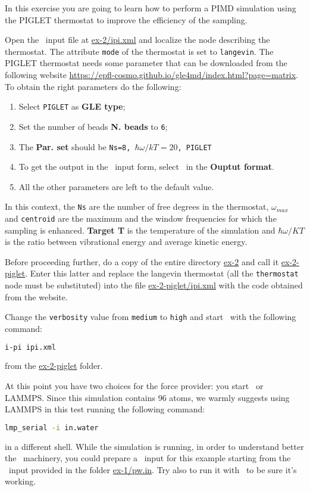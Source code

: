 \documentclass{article}
\begin{document}
\begin{Exercise}[label={inputs},title={Liquid water with the
    \emph{PIGLET} thermostat}]
In this exercise you are going to learn how to perform a PIMD
simulation using the PIGLET thermostat to improve the efficiency of
the sampling.

\Question
Open the \ipi\ input file at \url{ex-2/ipi.xml} and localize the node
describing the thermostat. The attribute \texttt{mode} of the
thermostat is set to \texttt{langevin}. The PIGLET thermostat needs
some parameter that can be downloaded from the following website
\url{https://epfl-cosmo.github.io/gle4md/index.html?page=matrix}.
To obtain the right parameters do the following:
\begin{enumerate}
\item Select \texttt{PIGLET} as \textbf{GLE type};
\item Set the number of beads \textbf{N. beads} to \texttt{6};
\item The \textbf{Par. set} should be \texttt{Ns=8,
    $\hbar\omega/kT=20$, PIGLET}
\item To get the output in the \ipi\ input form, select \ipi\ in the
  \textbf{Ouptut format}.
\item All the other parameters are left to the default value.
\end{enumerate}
In this context, the \texttt{Ns} are the number of free degrees in the
thermostat, $\omega_{max}$ and \texttt{centroid} are the maximum
and the window frequencies for which the sampling is
enhanced. \textbf{Target T} is the temperature of the simulation and
$\hbar\omega/KT$ is the ratio between vibrational energy and average
kinetic energy.

Before proceeding further, do a copy of the entire directory
\url{ex-2} and call it \url{ex-2-piglet}. Enter this latter and
replace the langevin thermostat (all the \texttt{thermostat} node must
be substituted) into the file \url{ex-2-piglet/ipi.xml} with the code
obtained from the website.

\Question
Change the \texttt{verbosity} value from \texttt{medium} to
\texttt{high} and start \ipi\ with the following command:
\begin{lstlisting}[language=bash]
i-pi ipi.xml
\end{lstlisting}
from the \url{ex-2-piglet} folder.

At this point you have two choices for the force provider: you start
\PWscf\ or LAMMPS. Since this simulation contains 96 atoms, we warmly
suggests using LAMMPS in this test running the following command:
\begin{lstlisting}[language=bash]
lmp_serial -i in.water
\end{lstlisting}
in a different shell. While the simulation is running, in order to
understand better the \ipi\ machinery, you could prepare a \pwx\ input
for this example starting from the \pwx\ input provided in the folder
\url{ex-1/pw.in}. Try also to run it with \ipi\ to be sure it's working.


\end{Exercise}
\end{document}
